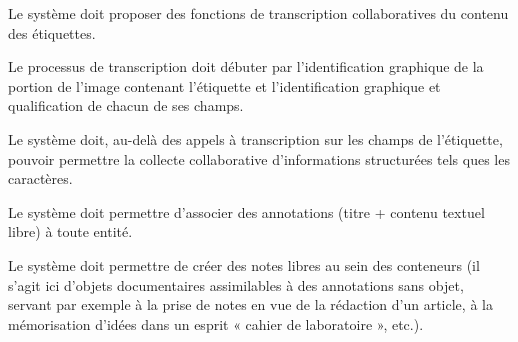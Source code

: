 \startchapter[title={Travail sur les entités}]

\startsection[title={Fonctions de transcriptions}]

\exig{}
Le système doit proposer des fonctions de transcription collaboratives du contenu des étiquettes.

\idea{}
Le processus de transcription doit débuter par l'identification graphique de la portion de l'image contenant l'étiquette et l'identification graphique et qualification de chacun de ses champs.

\exig{}
Le système doit, au-delà des appels à transcription sur les champs de l'étiquette, pouvoir permettre la collecte collaborative d'informations structurées tels ques les caractères.
		
\startsection[title={Annotation}]

\exig{}
Le système doit permettre d'associer des annotations (titre + contenu textuel libre) à toute entité.

\exig{}
Le système doit permettre de créer des notes libres au sein des conteneurs (il s'agit ici d'objets documentaires assimilables à des annotations sans objet, servant par exemple à la prise de notes en vue de la rédaction d'un article, à la mémorisation d'idées dans un esprit « cahier de laboratoire », etc.).

\startsection[title={Pages entité}]

